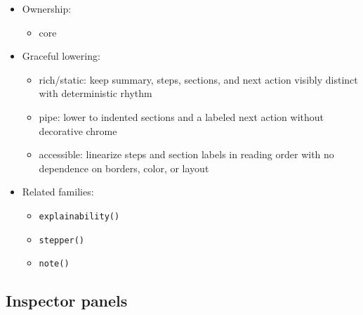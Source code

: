 \begin{itemize}
  \begin{itemize}
  \tightlist
  \item
    title the flow with the outcome the user is working toward
  \item
    keep step titles short and give each step one detail line with an honest status
  \item
    state the next action as one imperative sentence
  \item
    use sections for reasons and operator notes, and mute supporting copy instead of adding more boxes
  \end{itemize}
\item
  Ownership:

  \begin{itemize}
  \tightlist
  \item
    core
  \end{itemize}
\item
  Graceful lowering:

  \begin{itemize}
  \tightlist
  \item
    rich/static: keep summary, steps, sections, and next action visibly distinct with deterministic rhythm
  \item
    pipe: lower to indented sections and a labeled next action without decorative chrome
  \item
    accessible: linearize steps and section labels in reading order with no dependence on borders, color, or layout
  \end{itemize}
\item
  Related families:

  \begin{itemize}
  \tightlist
  \item
    \texttt{e\allowbreak{}x\allowbreak{}p\allowbreak{}l\allowbreak{}a\allowbreak{}i\allowbreak{}n\allowbreak{}a\allowbreak{}b\allowbreak{}i\allowbreak{}l\allowbreak{}i\allowbreak{}t\allowbreak{}y\allowbreak{}(\allowbreak{})\allowbreak{}}
  \item
    \texttt{s\allowbreak{}t\allowbreak{}e\allowbreak{}p\allowbreak{}p\allowbreak{}e\allowbreak{}r\allowbreak{}(\allowbreak{})\allowbreak{}}
  \item
    \texttt{n\allowbreak{}o\allowbreak{}t\allowbreak{}e\allowbreak{}(\allowbreak{})\allowbreak{}}
  \end{itemize}
\end{itemize}

\subsection{Inspector panels}\label{record-019-inspector-panels}


